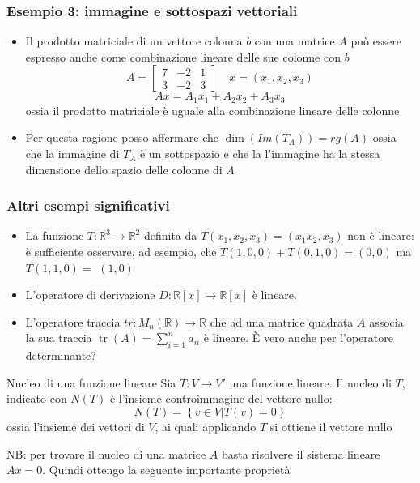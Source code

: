 \subsubsection*{Esempio 3: immagine e sottospazi vettoriali}
\begin{center}
\end{center}

\begin{itemize}
	\item Il prodotto matriciale di un vettore colonna $ b $ con una matrice $ A $ può essere espresso anche come combinazione lineare delle sue colonne con $ b $
	      \[
		      A =
		      \begin{bmatrix}
			      7 & -2 & 1 \\
			      3 & -2 & 3
		      \end{bmatrix}
		      \quad
		      x=\left( x_1, x_2, x_3 \right)
	      \]
	      \[
		      Ax = A_1 x_1 + A_2x_2 + A_3 x_3
	      \]
	      ossia il prodotto matriciale è uguale alla combinazione lineare delle colonne
	\item Per questa ragione posso affermare che $ \dim \left( Im\left( T_A \right)  \right) = rg \left( A \right)  $ ossia che la immagine di $ T_A $ è un sottospazio e che la l'immagine ha la stessa dimensione dello spazio delle colonne di $ A $
\end{itemize}

\subsubsection*{Altri esempi significativi}
\begin{itemize}
	\item La funzione $T: \mathbb{R}^3 \rightarrow \mathbb{R}^2$ definita da $T\left(x_1, x_2, x_3\right)=\left(x_1 x_2, x_3\right)$ non è lineare: è sufficiente osservare, ad esempio, che $T(1,0,0)+T(0,1,0)=(0,0)$ ma $T(1,1,0)=$ $(1,0)$
	\item L'operatore di derivazione $D: \mathbb{R}[x] \rightarrow \mathbb{R}[x]$ è lineare.
	\item L'operatore traccia $t r: M_n(\mathbb{R}) \rightarrow \mathbb{R}$ che ad una matrice quadrata $A$ associa la sua traccia $\operatorname{tr}(A)=\sum_{i=1}^n a_{i i}$ è lineare. È vero anche per l'operatore determinante?
\end{itemize}
\begin{definizione}{Nucleo di una funzione lineare}
	Sia $  T: V \to V' $ una funzione lineare. Il nucleo di $ T $, indicato con $ N\left( T \right)  $ è l'insieme controimmagine del vettore nullo:
	\[
		N\left( T \right) = \left\{ v \in  V|T\left( v \right) =0 \right\}
	\]
	ossia l'insieme dei vettori di $ V $, ai quali applicando $ T $ si ottiene il vettore nullo
\end{definizione}
NB: per trovare il nucleo di una matrice $ A $ basta risolvere il sistema lineare $ Ax=0 $. Quindi ottengo la seguente importante proprietà
